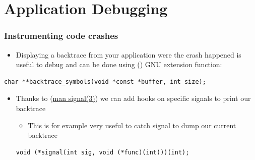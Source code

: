 \section{Application Debugging}

\begin{frame}[fragile]
  \frametitle{Instrumenting code crashes}
  \begin{itemize}
      \item Displaying a backtrace from your application were the crash happened
            is useful to debug and can be done using 
            () GNU extension function:
  \end{itemize}
    \begin{block}{}
      \begin{verbatim}
char **backtrace_symbols(void *const *buffer, int size);
      \end{verbatim}
    \end{block}

  \begin{itemize}
    \item Thanks to  (\href{https://man7.org/linux/man-pages/man7/signal.7.html}{man signal(3)})
          we can add hooks on specific signals to print our backtrace
    \begin{itemize}
      \item This is for example very useful to catch  signal to dump our current backtrace
    \end{itemize}
    \begin{block}{}
      \begin{verbatim}
void (*signal(int sig, void (*func)(int)))(int);
      \end{verbatim}
    \end{block}
  \end{itemize}
\end{frame}

